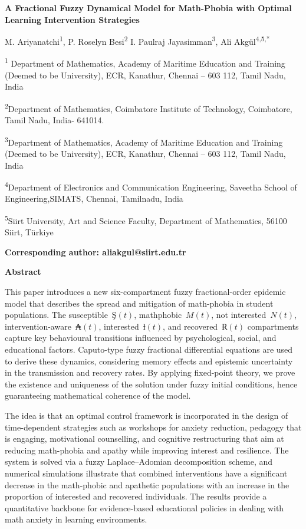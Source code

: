 \textbf{A Fractional Fuzzy Dynamical Model for Math-Phobia with Optimal Learning Intervention Strategies}

M. Ariyanatchi\textsuperscript{1}, P. Roselyn Besi\textsuperscript{2} I. Paulraj Jayasimman\textsuperscript{3}, Ali Akgül\textsuperscript{4,5,*}

\textsuperscript{1} Department of Mathematics, Academy of Maritime Education and Training (Deemed to be University), ECR, Kanathur, Chennai -- 603 112, Tamil Nadu, India

\textsuperscript{2}Department of Mathematics, Coimbatore Institute of Technology, Coimbatore, Tamil Nadu, India- 641014.

\textsuperscript{3}Department of Mathematics, Academy of Maritime Education and Training (Deemed to be University), ECR, Kanathur, Chennai -- 603 112, Tamil Nadu, India

\textsuperscript{4}Department of Electronics and Communication Engineering, Saveetha School of Engineering,SIMATS, Chennai, Tamilnadu, India

\textsuperscript{5}Siirt University, Art and Science Faculty, Department of Mathematics, 56100 Siirt, Türkiye

\textbf{Corresponding author: aliakgul@siirt.edu.tr}

\textbf{Abstract}

This paper introduces a new six-compartment fuzzy fractional-order epidemic model that describes the spread and mitigation of math-phobia in student populations. The susceptible~\(Ş(t)\), mathphobic~\(M(t)\), not interested~\(N(t)\), intervention-aware~\(₳(t)\), interested~\(ƚ(t)\), and recovered~\(Ɍ(t)\) compartments capture key behavioural transitions influenced by psychological, social, and educational factors. Caputo-type fuzzy fractional differential equations are used to derive these dynamics, considering memory effects and epistemic uncertainty in the transmission and recovery rates. By applying fixed-point theory, we prove the existence and uniqueness of the solution under fuzzy initial conditions, hence guaranteeing mathematical coherence of the model.

The idea is that an optimal control framework is incorporated in the design of time-dependent strategies such as workshops for anxiety reduction, pedagogy that is engaging, motivational counselling, and cognitive restructuring that aim at reducing math-phobia and apathy while improving interest and resilience. The system is solved via a fuzzy Laplace--Adomian decomposition scheme, and numerical simulations illustrate that combined interventions have a significant decrease in the math-phobic and apathetic populations with an increase in the proportion of interested and recovered individuals. The results provide a quantitative backbone for evidence-based educational policies in dealing with math anxiety in learning environments.


